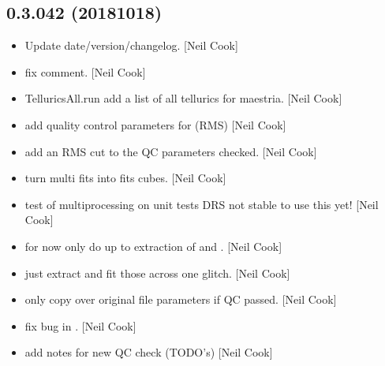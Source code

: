 \documentclass[a4paper,10pt,english]{report}
\begin{document}
\subsection{0.3.042 (2018\sphinxhyphen{}10\sphinxhyphen{}18)}
\label{\detokenize{misc/changelog:id308}}\begin{itemize}
\item {} 
Update date/version/changelog. {[}Neil Cook{]}

\item {} 
 \sphinxhyphen{} fix comment. {[}Neil Cook{]}

\item {} 
TelluricsAll.run \sphinxhyphen{} add a list of all tellurics for maestria. {[}Neil
Cook{]}

\item {} 
 \sphinxhyphen{} add quality control parameters for 
(RMS) {[}Neil Cook{]}

\item {} 
 \sphinxhyphen{} add an RMS cut to the QC parameters checked. {[}Neil
Cook{]}

\item {} 
 \sphinxhyphen{} turn multi fits into fits cubes. {[}Neil Cook{]}

\item {} 
 \sphinxhyphen{} test of multiprocessing on unit tests \sphinxhyphen{} DRS
not stable to use this yet! {[}Neil Cook{]}

\item {} 
 \sphinxhyphen{} for now only do up to extraction of  and
. {[}Neil Cook{]}

\item {} 
 \sphinxhyphen{} just extract and fit those across one glitch. {[}Neil
Cook{]}

\item {} 
 only copy over original file parameters if QC passed.
{[}Neil Cook{]}

\item {} 
 \sphinxhyphen{} fix bug in . {[}Neil Cook{]}

\item {} 
 \sphinxhyphen{} add notes for new QC check (TODO’s) {[}Neil Cook{]}


\end{itemize}
\end{document}
